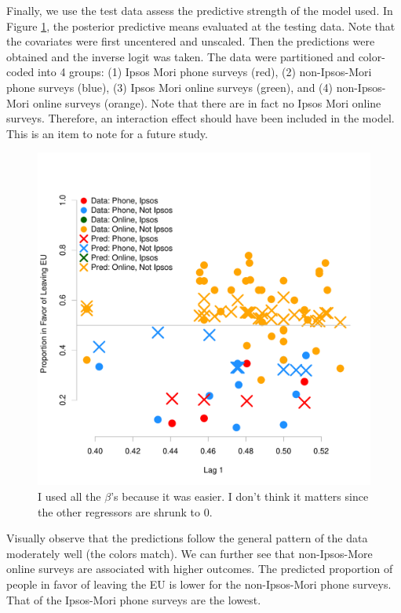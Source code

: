 \documentclass{../../tex_template/asaproc}
\begin{document}
Finally, we use the test data assess the predictive strength of the model used.
In Figure \ref{fig:preds}, the posterior predictive means evaluated at the
testing data. Note that the covariates were first uncentered and unscaled.
Then the predictions were obtained and the inverse logit was taken.  The data
were partitioned and color-coded into 4 groups: (1) Ipsos Mori phone surveys
(red), (2) non-Ipsos-Mori phone surveys (blue), (3) Ipsos Mori online surveys
(green), and (4) non-Ipsos-Mori online surveys (orange).  Note that there are
in fact no Ipsos Mori online surveys. Therefore, an interaction effect should
have been included in the model. This is an item to note for a future study.
\begin{figure}[H]
  \includegraphics[scale=.5]{figs/preds.pdf}
  \caption{\small I used all the $\beta$'s because it was easier. I don't think it matters since the other regressors are shrunk to 0.}
  \label{fig:preds}
\end{figure}
Visually observe that the predictions follow the general pattern of the data
moderately well (the colors match). We can further see that non-Ipsos-More
online surveys are associated with higher outcomes. The predicted proportion of
people in favor of leaving the EU is lower for the non-Ipsos-Mori phone
surveys. That of the Ipsos-Mori phone surveys are the lowest.
\end{document}
